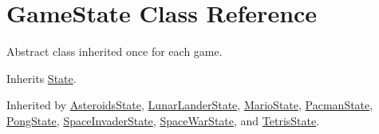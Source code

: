 \hypertarget{class_game_state}{\section{Game\-State Class Reference}
\label{class_game_state}
}


Abstract class inherited once for each game. 




Inherits \hyperlink{class_state}{State}.



Inherited by \hyperlink{class_asteroids_state}{Asteroids\-State}, \hyperlink{class_lunar_lander_state}{Lunar\-Lander\-State}, \hyperlink{class_mario_state}{Mario\-State}, \hyperlink{class_pacman_state}{Pacman\-State}, \hyperlink{class_pong_state}{Pong\-State}, \hyperlink{class_space_invader_state}{Space\-Invader\-State}, \hyperlink{class_space_war_state}{Space\-War\-State}, and \hyperlink{class_tetris_state}{Tetris\-State}.

